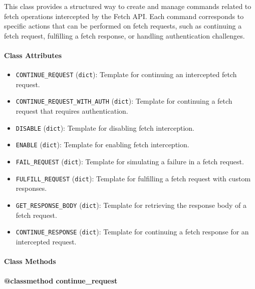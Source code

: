 \documentclass{article}
\begin{document}
\noindent This class provides a structured way to create and manage commands related to fetch operations intercepted by the Fetch API\@. Each command corresponds to specific actions that can be performed on fetch requests, such as continuing a fetch request, fulfilling a fetch response, or handling authentication challenges.

\paragraph{Class Attributes}

\begin{itemize}
    \item \lstinline[style=pythonstyle]|CONTINUE_REQUEST| (\lstinline[style=pythonstyle]|dict|): Template for continuing an intercepted fetch request.
    \item \lstinline[style=pythonstyle]|CONTINUE_REQUEST_WITH_AUTH| (\lstinline[style=pythonstyle]|dict|): Template for continuing a fetch request that requires authentication.
    \item \lstinline[style=pythonstyle]|DISABLE| (\lstinline[style=pythonstyle]|dict|): Template for disabling fetch interception.
    \item \lstinline[style=pythonstyle]|ENABLE| (\lstinline[style=pythonstyle]|dict|): Template for enabling fetch interception.
    \item \lstinline[style=pythonstyle]|FAIL_REQUEST| (\lstinline[style=pythonstyle]|dict|): Template for simulating a failure in a fetch request.
    \item \lstinline[style=pythonstyle]|FULFILL_REQUEST| (\lstinline[style=pythonstyle]|dict|): Template for fulfilling a fetch request with custom responses.
    \item \lstinline[style=pythonstyle]|GET_RESPONSE_BODY| (\lstinline[style=pythonstyle]|dict|): Template for retrieving the response body of a fetch request.
    \item \lstinline[style=pythonstyle]|CONTINUE_RESPONSE| (\lstinline[style=pythonstyle]|dict|): Template for continuing a fetch response for an intercepted request.
\end{itemize}

\paragraph{Class Methods}
\paragraph{@classmethod continue\_request}
\end{document}
